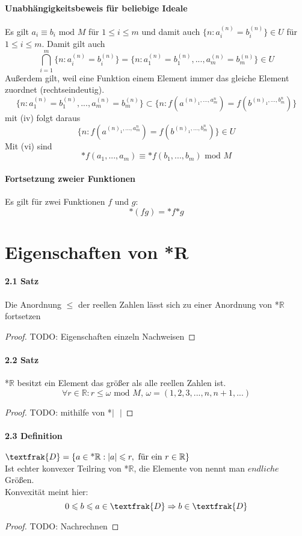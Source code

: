 \documentclass[a4paper]{article}
\begin{document}
\paragraph{Unabhängigkeitsbeweis für beliebige Ideale}
Es gilt $ a_i \equiv b_i \text{ mod } M $ für $ 1 \leqslant i \leqslant m $ und damit auch $ \{n: a^{(n)}_i = b^{(n)}_i\} \in U $ für 
$ 1 \leqslant i \leqslant m $. Damit gilt auch
$$ \bigcap_{i = 1}^m \{n: a^{(n)}_i = b^{(n)}_i\} = \{n: a^{(n)}_1 = b^{(n)}_1,...,a^{(n)}_m = b^{(n)}_m\} \in U $$
Außerdem gilt, weil eine Funktion einem Element immer das gleiche Element zuordnet (rechtseindeutig). 
$$ \{n: a^{(n)}_1 = b^{(n)}_1,...,a^{(n)}_m = b^{(n)}_m\} \subset \{n: f(a^{(n)_1,...,a^{n}_m}) = f(b^{(n)_1,...,b^{n}_m})\} $$
mit (iv) folgt daraus
$$ \{n: f(a^{(n)_1,...,a^{n}_m}) = f(b^{(n)_1,...,b^{n}_m})\} \in U $$ 
Mit (vi) sind 
$$ \text{*}f(a_1,...,a_m) \equiv \text{*}f(b_1,...,b_m) \text{ mod } M $$ 


\paragraph{Fortsetzung zweier Funktionen}
Es gilt für zwei Funktionen $ f $ und $ g $:
$$ \text{*}(f g) = \text{*}f \text{*}g$$
\section{Eigenschaften von *R}

\paragraph{2.1 Satz} Die Anordnung $\leqslant$ der reellen Zahlen lässt 
sich zu einer Anordnung von *$\mathbb{R}$ fortsetzen
\begin{proof}
      TODO: Eigenschaften einzeln Nachweisen
\end{proof}

\paragraph{2.2 Satz} *$\mathbb{R}$ besitzt ein Element das größer als alle reellen Zahlen ist. 
$$ \forall r \in \mathbb{R} : r \leqslant \omega \text{ mod } M \text{, } \omega = (1,2,3,...,n,n+1,...) $$
\begin{proof}
      TODO: mithilfe von *$|\text{ } | $ 
\end{proof}

\paragraph{2.3 Definition} $ \textfrak{D} = \{a \in \text{*}\mathbb{R}: |a| \leqslant r, \text{ für ein } r \in \mathbb{R}\} $ \\
Ist echter konvexer Teilring von *$\mathbb{R}$, die Elemente von  nennt man $ endliche $ Größen. \\
Konvexität meint hier:
$$ 0 \leqslant b \leqslant a \in \textfrak{D} \Rightarrow b \in \textfrak{D} $$
\begin{proof}
      TODO: Nachrechnen
\end{proof}
\end{document}
